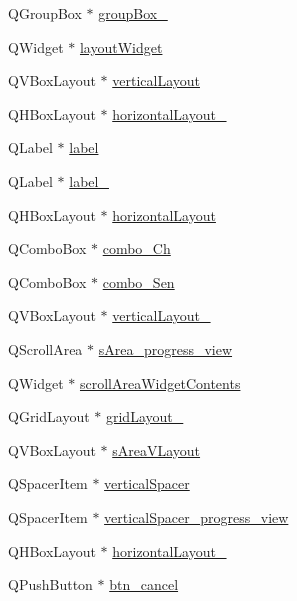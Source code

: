 \begin{DoxyCompactItemize}
\item 
Q\+Group\+Box $\ast$ \hyperlink{a00080_a320d3d7ba1cb8fff7b7b95923ed10f5e}{group\+Box\+\_}
\item 
Q\+Widget $\ast$ \hyperlink{a00080_ab96ab0f0578098521fa69a75aa5cdde8}{layout\+Widget}
\item 
Q\+V\+Box\+Layout $\ast$ \hyperlink{a00080_aecd96a04789fcfec3f98d80390ad8184}{vertical\+Layout}
\item 
Q\+H\+Box\+Layout $\ast$ \hyperlink{a00080_a80867018070156432923d0266cc9fe25}{horizontal\+Layout\+\_}
\item 
Q\+Label $\ast$ \hyperlink{a00080_ad9c89133780f28e6efa2ec17ceb9cff5}{label}
\item 
Q\+Label $\ast$ \hyperlink{a00080_a2e2516d755e4dd53fc905dabddf2738a}{label\+\_}
\item 
Q\+H\+Box\+Layout $\ast$ \hyperlink{a00080_acd6fdc9ebacc4b25b834162380d75ce8}{horizontal\+Layout}
\item 
Q\+Combo\+Box $\ast$ \hyperlink{a00080_a263fb43f2eff37a44ff7359ba41e2eeb}{combo\+\_\+\+Ch}
\item 
Q\+Combo\+Box $\ast$ \hyperlink{a00080_ad95005b5fcac8126171019298147b285}{combo\+\_\+\+Sen}
\item 
Q\+V\+Box\+Layout $\ast$ \hyperlink{a00080_afcc20a3d5058037a00cdc6122f231848}{vertical\+Layout\+\_}
\item 
Q\+Scroll\+Area $\ast$ \hyperlink{a00080_ae4fe44aa026dd0e84e0f10cdcabca504}{s\+Area\+\_\+progress\+\_\+view}
\item 
Q\+Widget $\ast$ \hyperlink{a00080_aa70fc2af9f9ea3b686db12823c5deb47}{scroll\+Area\+Widget\+Contents}
\item 
Q\+Grid\+Layout $\ast$ \hyperlink{a00080_af42ea7d4c2e893181caad21e28166932}{grid\+Layout\+\_}
\item 
Q\+V\+Box\+Layout $\ast$ \hyperlink{a00080_a2bdce9ad313cd4ee575613f36cbc4678}{s\+Area\+V\+Layout}
\item 
Q\+Spacer\+Item $\ast$ \hyperlink{a00080_a8384329c3663ff274e926a12024aab52}{vertical\+Spacer}
\item 
Q\+Spacer\+Item $\ast$ \hyperlink{a00080_a1c7dd277b3eb0ab06b980e95e1b0be29}{vertical\+Spacer\+\_\+progress\+\_\+view}
\item 
Q\+H\+Box\+Layout $\ast$ \hyperlink{a00080_a17c8bb967f8ecc58406ac7ca1bec7b7e}{horizontal\+Layout\+\_}
\item 
Q\+Push\+Button $\ast$ \hyperlink{a00080_a26ea4040157d183322b8c1e5d7a55c9f}{btn\+\_\+cancel}
\item 

\end{DoxyCompactItemize}

